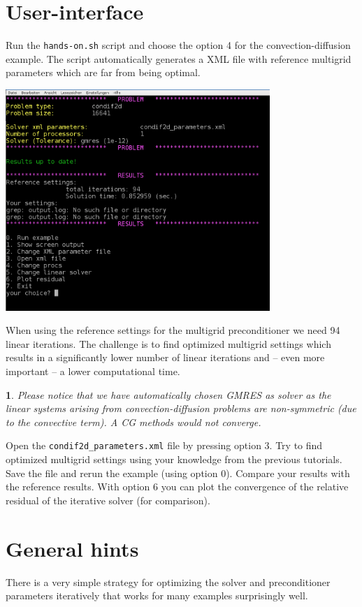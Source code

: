 \documentclass[10pt,fleqn]{book}
\newtheorem*{mycomment}{\ding{42}}
\begin{document}
\section{User-interface}
Run the \verb|hands-on.sh| script and choose the option 4 for the convection-diffusion example. The script automatically generates a XML file with reference multigrid parameters which are far from being optimal.
\begin{center}\includegraphics[width=10cm]{pics/tut1_16.png} \end{center}

When using the reference settings for the multigrid preconditioner we need 94 linear iterations. The challenge is to find optimized multigrid settings which results in a significantly lower number of linear iterations and -- even more important -- a lower computational time.

\begin{mycomment}
Please notice that we have automatically chosen GMRES as solver as the linear systems arising from convection-diffusion problems are non-symmetric (due to the convective term). A CG methods would not converge.
\end{mycomment}

\begin{exercise}
Open the \verb|condif2d_parameters.xml| file by pressing option 3. Try to find optimized multigrid settings using your knowledge from the previous tutorials. Save the file and rerun the example (using option 0). Compare your results with the reference results. With option 6 you can plot the convergence of the relative residual of the iterative solver (for comparison).
\end{exercise}

\section{General hints}
\label{sec:generalhings}
There is a very simple strategy for optimizing the solver and preconditioner parameters iteratively that works for many examples surprisingly well.
\end{document}
